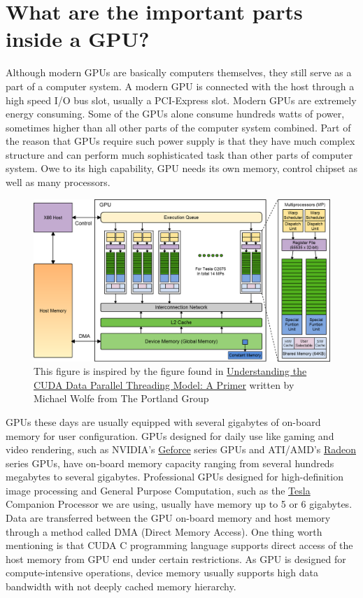 \documentclass[letterpaper,10pt,openany,oneside]{sphinxmanual}
\begin{document}
\section{What are the important parts inside a GPU?}
\label{Introduction/Introduction:tesla}\label{Introduction/Introduction:what-are-the-important-parts-inside-a-gpu}
Although modern GPUs are basically computers themselves, they still serve as a part of a computer system. A modern GPU is connected with the host through a high speed I/O bus slot, usually a PCI-Express slot. Modern GPUs are extremely energy consuming. Some of the GPUs alone consume hundreds watts of power, sometimes higher than all other parts of the computer system combined. Part of the reason that GPUs require such power supply is that they have much complex  structure and can perform much sophisticated task than other parts of computer system. Owe to its high capability, GPU needs its own memory, control chipset as well as many processors.
\begin{figure}[htbp]
\centering
\capstart

\includegraphics{CUDA.png}
\caption{This figure is inspired by the figure found in \href{http://www.pgroup.com/lit/articles/insider/v2n1a5.htm}{Understanding the CUDA Data Parallel Threading Model: A Primer} written by Michael Wolfe from The Portland Group}\end{figure}

GPUs these days are usually equipped with several gigabytes of on-board memory for user configuration. GPUs designed for daily use like gaming and video rendering, such as NVIDIA's \href{http://www.nvidia.com/object/geforce\_family.html}{Geforce} series GPUs and ATI/AMD's \href{http://www.amd.com/us/products/desktop/graphics/pages/desktop-graphics.aspx}{Radeon} series GPUs, have on-board memory capacity ranging from several hundreds megabytes to several gigabytes. Professional GPUs designed for high-definition image processing and General Purpose Computation, such as the \href{http://www.nvidia.com/object/tesla-supercomputing-solutions.html}{Tesla} Companion Processor we are using, usually have memory up to 5 or 6 gigabytes. Data are transferred between the GPU on-board memory and host memory through a method called DMA (Direct Memory Access). One thing worth mentioning is that CUDA C programming language supports direct access of the host memory from GPU end under certain restrictions. As GPU is designed for compute-intensive operations, device memory usually supports high data bandwidth with not deeply cached memory hierarchy.
\end{document}

